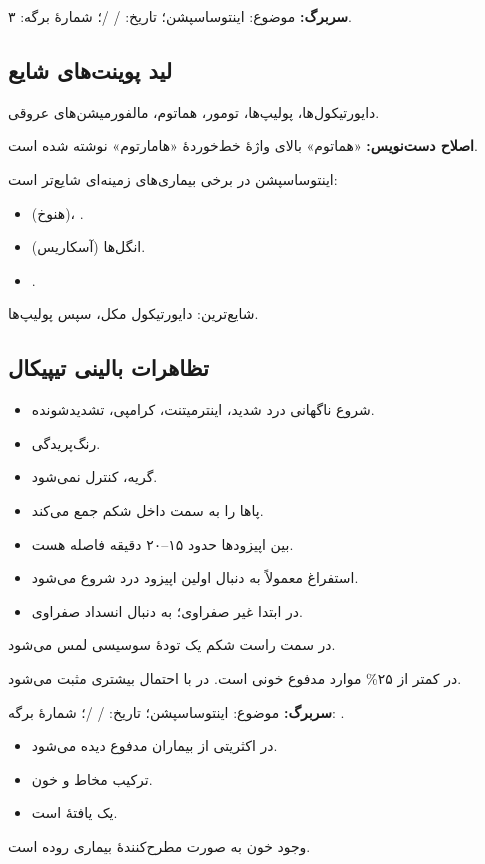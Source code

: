\documentclass[12pt,a4paper]{article}
\begin{document}
\textbf{سربرگ:} موضوع: اینتوساسپشن؛ تاریخ: / /؛ شمارهٔ برگه: ۳.
\subsection*{لید پوینت‌های شایع}
دایورتیکول‌ها، پولیپ‌ها، تومور، هماتوم، مالفورمیشن‌های عروقی.

\textbf{اصلاح دست‌نویس:} «هماتوم» بالای واژهٔ خط‌خوردهٔ «هامارتوم» نوشته شده است.

اینتوساسپشن در برخی بیماری‌های زمینه‌ای شایع‌تر است:
\begin{itemize}
\item {} (هنوخ)، .
\item انگل‌ها (آسکاریس).
\item {}.
\end{itemize}
شایع‌ترین: دایورتیکول مکل، سپس پولیپ‌ها.

\subsection*{تظاهرات بالینی تیپیکال}
\begin{itemize}
\item شروع ناگهانی درد شدید، اینترمیتنت، کرامپی، تشدیدشونده.
\item رنگ‌پریدگی.
\item گریه، کنترل نمی‌شود.
\item پاها را به سمت داخل شکم جمع می‌کند.
\item بین اپیزودها حدود ۱۵–۲۰ دقیقه فاصله هست.
\item استفراغ معمولاً به دنبال اولین اپیزود درد شروع می‌شود.
\item در ابتدا غیر صفراوی؛ به دنبال انسداد \IntussusceptionArrow صفراوی.
\end{itemize}
در سمت راست شکم یک تودهٔ سوسیسی لمس می‌شود.

در کمتر از ۲۵\% موارد مدفوع خونی است. در  با احتمال بیشتری مثبت می‌شود.

\textbf{سربرگ:} موضوع: اینتوساسپشن؛ تاریخ: / /؛ شمارهٔ برگه: .
\begin{itemize}
\item در اکثریتی از بیماران مدفوع  دیده می‌شود.
\item ترکیب مخاط و خون.
\item یک یافتهٔ  است.
\end{itemize}
وجود خون به صورت  مطرح‌کنندهٔ بیماری روده است.
\end{document}
